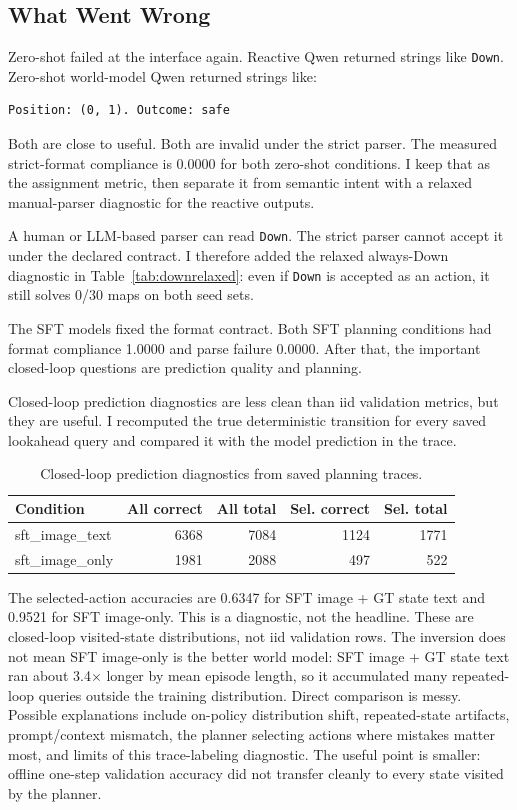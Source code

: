 \documentclass{article}
\newcommand{\code}[1]{\texttt{#1}}
\begin{document}
\subsection{What Went Wrong}

Zero-shot failed at the interface again. Reactive Qwen returned strings like \code{Down}. Zero-shot world-model Qwen returned strings like:

\begin{verbatim}
Position: (0, 1). Outcome: safe
\end{verbatim}

Both are close to useful. Both are invalid under the strict parser. The measured strict-format compliance is 0.0000 for both zero-shot conditions. I keep that as the assignment metric, then separate it from semantic intent with a relaxed manual-parser diagnostic for the reactive outputs.

A human or LLM-based parser can read \code{Down}. The strict parser cannot accept it under the declared contract. I therefore added the relaxed always-Down diagnostic in Table~\ref{tab:downrelaxed}: even if \code{Down} is accepted as an action, it still solves 0/30 maps on both seed sets.

The SFT models fixed the format contract. Both SFT planning conditions had format compliance 1.0000 and parse failure 0.0000. After that, the important closed-loop questions are prediction quality and planning.

Closed-loop prediction diagnostics are less clean than iid validation metrics, but they are useful. I recomputed the true deterministic transition for every saved lookahead query and compared it with the model prediction in the trace.

\begin{table}[t]
\caption{Closed-loop prediction diagnostics from saved planning traces.}
\label{tab:closedloop}
\centering
\scriptsize
\begin{tabular}{lrrrr}
\toprule
Condition & All correct & All total & Sel. correct & Sel. total \\
\midrule
sft\_image\_text & 6368 & 7084 & 1124 & 1771 \\
sft\_image\_only & 1981 & 2088 & 497 & 522 \\
\bottomrule
\end{tabular}
\end{table}

The selected-action accuracies are 0.6347 for SFT image + GT state text and 0.9521 for SFT image-only. This is a diagnostic, not the headline. These are closed-loop visited-state distributions, not iid validation rows. The inversion does not mean SFT image-only is the better world model: SFT image + GT state text ran about 3.4$\times$ longer by mean episode length, so it accumulated many repeated-loop queries outside the training distribution. Direct comparison is messy. Possible explanations include on-policy distribution shift, repeated-state artifacts, prompt/context mismatch, the planner selecting actions where mistakes matter most, and limits of this trace-labeling diagnostic. The useful point is smaller: offline one-step validation accuracy did not transfer cleanly to every state visited by the planner.
\end{document}
